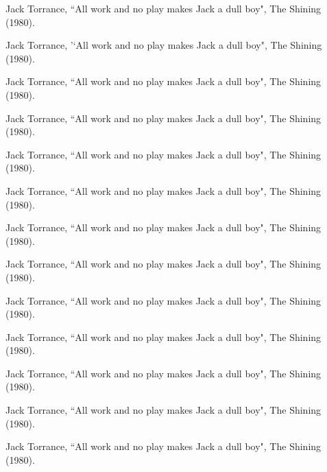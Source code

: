 	\item Jack Torrance, ``All work and no play makes Jack a dull boy", The Shining (1980).
	\item \hspace{5mm}Jack Torrance, '`All work and no play makes Jack a dull boy", The Shining (1980).
	\item \hspace{10mm}Jack Torrance, ``All work and no play makes Jack a dull boy", The Shining (1980).
	\item \hspace{15mm}Jack Torrance, ``All work and no play makes Jack a dull boy", The Shining (1980).
	\item \hspace{20mm}Jack Torrance, ``All work and no play makes Jack a dull boy", The Shining (1980).
	\item \hspace{25mm}Jack Torrance, ``All work and no play makes Jack a dull boy", The Shining (1980).
	\item \hspace{30mm}Jack Torrance, ``All work and no play makes Jack a dull boy", The Shining (1980).
	\item \hspace{25mm}Jack Torrance, ``All work and no play makes Jack a dull boy", The Shining (1980).
	\item \hspace{20mm}Jack Torrance, ``All work and no play makes Jack a dull boy", The Shining (1980).
	\item \hspace{15mm}Jack Torrance, ``All work and no play makes Jack a dull boy", The Shining (1980).
	\item \hspace{10mm}Jack Torrance, ``All work and no play makes Jack a dull boy", The Shining (1980).
	\item \hspace{5mm}Jack Torrance, ``All work and no play makes Jack a dull boy", The Shining (1980).
	\item Jack Torrance, ``All work and no play makes Jack a dull boy", The Shining (1980).
